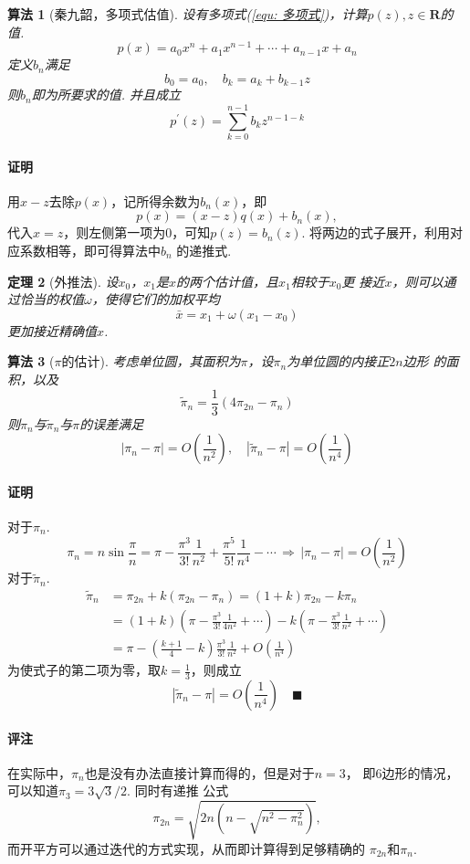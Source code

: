 \documentclass[12pt, a4paper]{article}
\theoremstyle{margin}
\newtheorem{thm}{定理}
\newtheorem{alg}[thm]{算法}
\newcommand{\R}{\mathbf{R}}
\newcommand\equref[1]{(\ref{#1})}
\newcommand{\remark}{\paragraph{评注}}
\newcommand{\proof}{\paragraph{证明}}
\begin{document}
  \begin{alg}[秦九韶，多项式估值]
    设有多项式\equref{equ: 多项式}，计算$p(z), z\in\R$的值.
    \begin{equation}
      \label{equ: 多项式}
      p(x) = a_0x^n + a_1x^{n-1} + \cdots + a_{n-1}x + a_n
    \end{equation}
    定义$b_n$满足
    \[
      b_0 = a_0, \quad b_k = a_k + b_{k-1}z
    \]
    则$b_n$即为所要求的值. 并且成立
    \[
      p^{\prime}(z) = \sum_{k=0}^{n-1}b_kz^{n-1-k}
    \]
  \end{alg}
  \proof
    用$x-z$去除$p(x)$，记所得余数为$b_n(x)$，即
    \[
      p(x) = (x-z)q(x) + b_n(x),
    \]
    代入$x=z$，则左侧第一项为$0$，可知$p(z) = b_n(z)$.
    将两边的式子展开，利用对应系数相等，即可得算法中$b_n$
    的递推式.

  \begin{thm}[外推法]
    设$x_0$，$x_1$是$x$的两个估计值，且$x_1$相较于$x_0$更
    接近$x$，则可以通过恰当的权值$\omega$，使得它们的加权平均
    \[
      \bar{x} = x_1 + \omega(x_1-x_0)
    \]
    更加接近精确值$x$.
  \end{thm}

  \begin{alg}[$\pi$的估计]
    考虑单位圆，其面积为$\pi$，设$\pi_n$为单位圆的内接正$2n$边形
    的面积，以及
    \[
      \widetilde{\pi}_n = \frac{1}{3}(4\pi_{2n}-\pi_n)
    \]
    则$\pi_n$与$\widetilde{\pi}_n$与$\pi$的误差满足
    \[
      |\pi_n - \pi| = O(\frac{1}{n^2}), \quad
      |\widetilde{\pi}_n - \pi| = O(\frac{1}{n^4})
    \]
  \end{alg}
  \proof
    对于$\pi_n$.
    \[
      \pi_n=n\sin\frac{\pi}{n} =
      \pi - \frac{\pi^3}{3!}\frac{1}{n^2} +
      \frac{\pi^5}{5!}\frac{1}{n^4} - \cdots
      \,\Rightarrow \, |\pi_n - \pi| = O(\frac{1}{n^2})
    \]
    对于$\widetilde{\pi}_n$.
    \[\begin{split}
      \widetilde{\pi}_n & = \pi_{2n} + k(\pi_{2n} - \pi_n)
      = (1+k)\pi_{2n} - k\pi_n \\
      & = (1+k)(\pi - \frac{\pi^3}{3!}\frac{1}{4n^2} + \cdots)
      - k(\pi - \frac{\pi^3}{3!}\frac{1}{n^2} + \cdots) \\
      & = \pi - (\frac{k+1}{4} - k)\frac{\pi^3}{3!}\frac{1}{n^2}
      + O(\frac{1}{n^4})
    \end{split}\]
    为使式子的第二项为零，取$k=\frac{1}{3}$，则成立
    \[
      |\widetilde{\pi}_n - \pi| = O(\frac{1}{n^4})
      \quad\blacksquare
    \]
  \remark
    在实际中，$\pi_n$也是没有办法直接计算而得的，但是对于$n=3$，
    即$6$边形的情况，可以知道$\pi_3=3\sqrt{3}/2$. 同时有递推
    公式
    \[
      \pi_{2n} = \sqrt{2n(n-\sqrt{n^2-\pi^2_n})},
    \]
    而开平方可以通过迭代的方式实现，从而即计算得到足够精确的
    $\pi_{2n}$和$\pi_n$.
\end{document}
